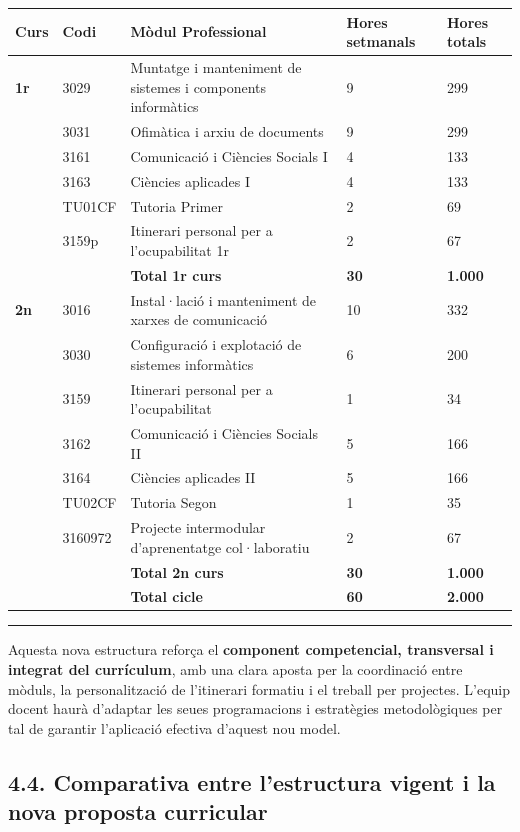 \documentclass[
  paper=a4,
  ,captions=tableheading
]{scrartcl}
\begin{document}
\begin{longtable}[]{@{}lllll@{}}
\toprule
\textbf{Curs} & \textbf{Codi} & \textbf{Mòdul Professional} &
\textbf{Hores setmanals} & \textbf{Hores totals} \\
\midrule
\endhead
\textbf{1r} & 3029 & Muntatge i manteniment de sistemes i components
informàtics & 9 & 299 \\
& 3031 & Ofimàtica i arxiu de documents & 9 & 299 \\
& 3161 & Comunicació i Ciències Socials I & 4 & 133 \\
& 3163 & Ciències aplicades I & 4 & 133 \\
& TU01CF & Tutoria Primer & 2 & 69 \\
& 3159p & Itinerari personal per a l'ocupabilitat 1r & 2 & 67 \\
& & \textbf{Total 1r curs} & \textbf{30} & \textbf{1.000} \\
\textbf{2n} & 3016 & Instal·lació i manteniment de xarxes de comunicació
& 10 & 332 \\
& 3030 & Configuració i explotació de sistemes informàtics & 6 & 200 \\
& 3159 & Itinerari personal per a l'ocupabilitat & 1 & 34 \\
& 3162 & Comunicació i Ciències Socials II & 5 & 166 \\
& 3164 & Ciències aplicades II & 5 & 166 \\
& TU02CF & Tutoria Segon & 1 & 35 \\
& 3160972 & Projecte intermodular d'aprenentatge col·laboratiu & 2 &
67 \\
& & \textbf{Total 2n curs} & \textbf{30} & \textbf{1.000} \\
& & \textbf{Total cicle} & \textbf{60} & \textbf{2.000} \\
\bottomrule
\end{longtable}

\begin{center}\rule{0.5\linewidth}{0.5pt}\end{center}

Aquesta nova estructura reforça el \textbf{component competencial,
transversal i integrat del currículum}, amb una clara aposta per la
coordinació entre mòduls, la personalització de l'itinerari formatiu i
el treball per projectes. L'equip docent haurà d'adaptar les seues
programacions i estratègies metodològiques per tal de garantir
l'aplicació efectiva d'aquest nou model.

\hypertarget{comparativa-entre-lestructura-vigent-i-la-nova-proposta-curricular}{%
\subsection{4.4. Comparativa entre l'estructura vigent i la nova
proposta
curricular}\label{comparativa-entre-lestructura-vigent-i-la-nova-proposta-curricular}}
\end{document}
